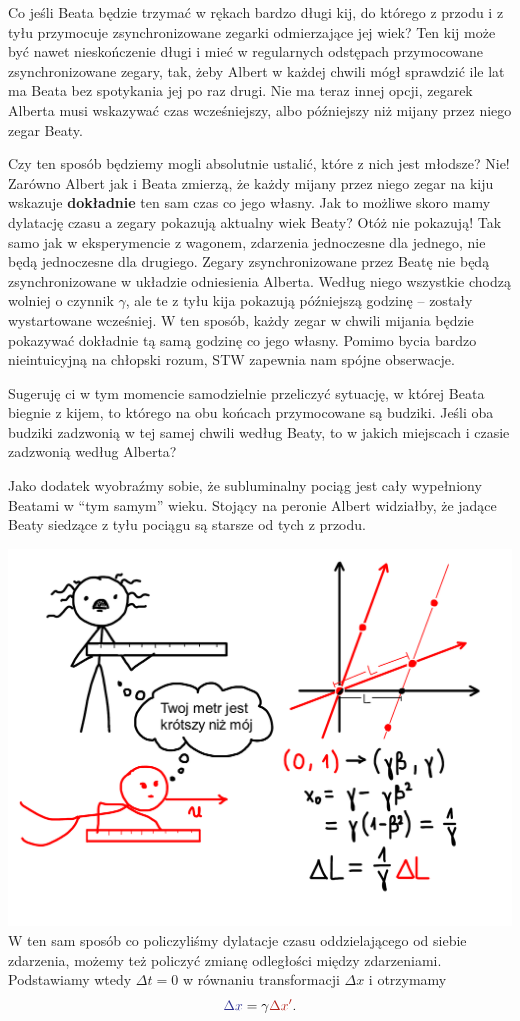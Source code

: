 \documentclass[10pt,twocolumn,fleqn,polish]{article}
\providecommand{\mathcolor}[2]{{\color{#1}#2}}
\newcommand{\mred}[1]{\mathcolor{BrickRed}{#1}}
\newcommand{\mblue}[1]{\mathcolor{Blue}{#1}}
\begin{document}
Co jeśli Beata będzie trzymać w rękach bardzo długi kij, do którego z przodu
i z tyłu przymocuje zsynchronizowane zegarki odmierzające jej wiek?
Ten kij może być nawet nieskończenie długi i mieć w regularnych odstępach przymocowane
zsynchronizowane zegary, tak, żeby Albert w każdej chwili mógł
sprawdzić ile lat ma Beata bez spotykania jej po raz drugi.
Nie ma teraz innej opcji, zegarek Alberta musi wskazywać czas
wcześniejszy, albo późniejszy niż mijany przez niego zegar Beaty.

Czy ten sposób będziemy mogli absolutnie ustalić, które z nich jest
młodsze? Nie! Zarówno Albert jak i Beata zmierzą, że każdy mijany przez niego zegar
na kiju wskazuje \textbf{dokładnie} ten sam czas co jego własny.
Jak to możliwe skoro mamy dylatację czasu a zegary pokazują aktualny
wiek Beaty? Otóż nie pokazują! Tak samo jak w eksperymencie z wagonem,
zdarzenia jednoczesne dla jednego, nie będą jednoczesne dla drugiego.
Zegary zsynchronizowane przez Beatę nie będą
zsynchronizowane w układzie odniesienia Alberta.
Według niego wszystkie chodzą wolniej o czynnik $\gamma$,
ale te z tyłu kija pokazują późniejszą godzinę -- zostały wystartowane wcześniej.
W ten sposób, każdy zegar w chwili mijania będzie pokazywać dokładnie tą samą godzinę co jego własny.
Pomimo bycia bardzo nieintuicyjną na chłopski rozum, STW zapewnia nam
spójne obserwacje.

Sugeruję ci w tym momencie samodzielnie przeliczyć sytuację, w której Beata biegnie
z kijem, to którego na obu końcach przymocowane są budziki.
Jeśli oba budziki zadzwonią w tej samej chwili według Beaty, to w jakich
miejscach i czasie zadzwonią według Alberta?

Jako dodatek wyobraźmy sobie, że subluminalny pociąg jest cały wypełniony
Beatami w ``tym samym'' wieku.
Stojący na peronie Albert widziałby, że jadące Beaty siedzące z
tyłu pociągu są starsze od tych z przodu.
\newpage

\noindent\includegraphics[width=1\linewidth]{pages/STA-page27}
W ten sam sposób co policzyliśmy dylatacje czasu oddzielającego od siebie zdarzenia,
możemy też policzyć zmianę odległości między zdarzeniami. Podstawiamy wtedy
$\Delta t = 0$ w równaniu transformacji $\Delta x$ i otrzymamy
\[ \mblue{\Delta x} = \gamma \mred{\Delta x'}. \]
\end{document}

